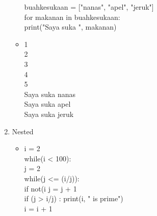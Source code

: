 \documentclass{article}
\begin{document}
\begin{enumerate}
\begin{itemize}
                                buahkesukaan = ["nanas", "apel", "jeruk"]\\
                                for makanan in buahkesukaan:\\
                                    print("Saya suka ", makanan)\\
                                    
                        \item   1\\
                                2\\
                                3\\
                                4\\
                                5\\
                                Saya suka  nanas\\
                                Saya suka  apel\\
                                Saya suka  jeruk\\
                    \end{itemize}
            \item Nested
                \begin{itemize}
                    \item   i = 2\\
                            while(i < 100):\\
                                j = 2\\
                                while(j <= (i/j)):\\
                                    if not(i%
                                    j = j + 1\\
                                if (j > i/j) : print(i, " is prime")\\
                                i = i + 1\\
                            

\end{itemize}
\end{enumerate}
\end{document}
